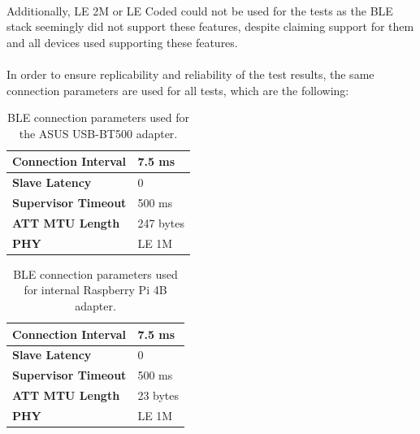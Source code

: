 \paragraph{} Additionally, LE 2M or LE Coded could not be used for the tests as the \acs{BLE} stack seemingly did not support these features, despite claiming support for them and all devices used supporting these features. %

\paragraph{} In order to ensure replicability and reliability of the test results, the same connection parameters are used for all tests, which are the following:

\begin{table}[H]
    \centering
    \caption{\acs{BLE} connection parameters used for the ASUS USB-BT500 adapter.}
    \begin{tabular}{|l|l|}
    \hline
    \textbf{Connection Interval} & 7.5 ms \\ \hline
    \textbf{Slave Latency}       & 0     \\ \hline
    \textbf{Supervisor Timeout}  & 500 ms \\ \hline
    \textbf{\acs{ATT} \acs{MTU} Length}      & 247 bytes   \\ \hline
    \textbf{\acs{PHY}}      & LE 1M   \\ \hline
    
    \end{tabular}
    \label{tab:ble-connection-values-hci1}
\end{table}

\begin{table}[H]
    \centering
    \caption{\acs{BLE} connection parameters used for internal Raspberry Pi 4B adapter.}
    \begin{tabular}{|l|l|}
    \hline
    \textbf{Connection Interval} & 7.5 ms \\ \hline
    \textbf{Slave Latency}       & 0     \\ \hline
    \textbf{Supervisor Timeout}  & 500 ms \\ \hline
    \textbf{\acs{ATT} \acs{MTU} Length}      & 23 bytes   \\ \hline
    \textbf{\acs{PHY}}      & LE 1M   \\ \hline
    \end{tabular}
    \label{tab:ble-connection-values-hci0}
\end{table}

